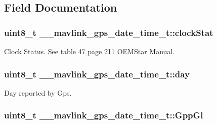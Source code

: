 \subsection{Field Documentation}
\hypertarget{struct____mavlink__gps__date__time__t_ac58008f1fdd32817e3852e646547cd44}{
\subsubsection[{clock\+Stat}]{\setlength{\rightskip}{0pt plus 5cm}uint8\+\_\+t \+\_\+\+\_\+mavlink\+\_\+gps\+\_\+date\+\_\+time\+\_\+t\+::clock\+Stat}}\label{struct____mavlink__gps__date__time__t_ac58008f1fdd32817e3852e646547cd44}


Clock Status. See table 47 page 211 O\+E\+M\+Star Manual. 

\hypertarget{struct____mavlink__gps__date__time__t_ab2d94b0c477cc22a2947bcdad0071487}{
\subsubsection[{day}]{\setlength{\rightskip}{0pt plus 5cm}uint8\+\_\+t \+\_\+\+\_\+mavlink\+\_\+gps\+\_\+date\+\_\+time\+\_\+t\+::day}}\label{struct____mavlink__gps__date__time__t_ab2d94b0c477cc22a2947bcdad0071487}


Day reported by Gps. 

\hypertarget{struct____mavlink__gps__date__time__t_a8baed589ebbe8c544543e84980c0720a}{
\subsubsection[{Gpp\+Gl}]{\setlength{\rightskip}{0pt plus 5cm}uint8\+\_\+t \+\_\+\+\_\+mavlink\+\_\+gps\+\_\+date\+\_\+time\+\_\+t\+::\+Gpp\+Gl}}\label{struct____mavlink__gps__date__time__t_a8baed589ebbe8c544543e84980c0720a}


